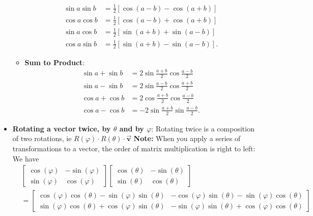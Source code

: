 \documentclass{report}
\begin{document}
\begin{itemize}
\begin{itemize}
\begin{align*}
                        \sin{a}\sin{b}  &= \frac{1}{2}[\cos{(a-b)-\cos{(a+b)}}]\\
                        \cos{a}\cos{b} &= \frac{1}{2}[\cos{(a-b)} + \cos{(a+b)}] \\
                        \sin{a}\cos{b} &= \frac{1}{2}[\sin{(a+b)}+\sin{(a-b)}] \\
                        \cos{a}\sin{b} &=\frac{1}{2}[\sin{(a+b)} - \sin{(a-b)}]
                    .\end{align*}
                \item \textbf{Sum to Product}:
                    \begin{align*}
                        \sin{a}+\sin{b} &=2\sin{\frac{a+b}{2}}\cos{\frac{a-b}{2}} \\
                        \sin{a}-\sin{b} &= 2\sin{\frac{a-b}{2}}\cos{\frac{a+b}{2}} \\
                        \cos{a}+\cos{b}  &= 2\cos{\frac{a+b}{2}}\cos{\frac{a-b}{2}} \\
                        \cos{a}-\cos{b}  & =-2\sin{\frac{a+b}{2}}\sin{\frac{a-b}{2}}
                    .\end{align*}
            \end{itemize}
        \item \textbf{Rotating a vector twice, by $\theta$ and by $\varphi$}: Rotating twice is a composition of two rotations, ie $R(\varphi) \cdot R(\theta) \cdot \vec{\mathbf{v}}$
            \bigbreak \noindent 
            \textbf{Note:} When you apply a series of transformations to a vector, the order of matrix multiplication is right to left:
            \bigbreak \noindent 
            We have
            \begin{align*}
                &\begin{bmatrix} \cos{\left(\varphi\right)} & -\sin{\left(\varphi\right)} \\ \sin{\left(\varphi\right)} & \cos{\left(\varphi\right)} \end{bmatrix} \begin{bmatrix} \cos{\left(\theta \right)} & -\sin{\left(\theta \right)} \\ \sin{\left(\theta \right)} & \cos{\left(\theta \right)}\end{bmatrix} \\
                &= \begin{bmatrix} \cos{\left(\varphi\right)}\cos{\left(\theta \right)} -\sin{\left(\varphi\right)}\sin{\left(\theta \right)} & -\cos{\left(\varphi \right)}\sin{\left(\theta \right)} -\sin{\left(\varphi\right)}\cos{\left(\theta \right)} \\ \sin{\left(\varphi\right)}\cos{\left(\theta \right)} + \cos{\left(\varphi\right)}\sin{\left(\theta \right)} & -\sin{\left(\varphi\right)}\sin{\left(\theta \right)}+\cos{\left(\varphi\right)}\cos{\left(\theta \right)}\end{bmatrix} 

\end{align*}
\end{itemize}
\end{document}
